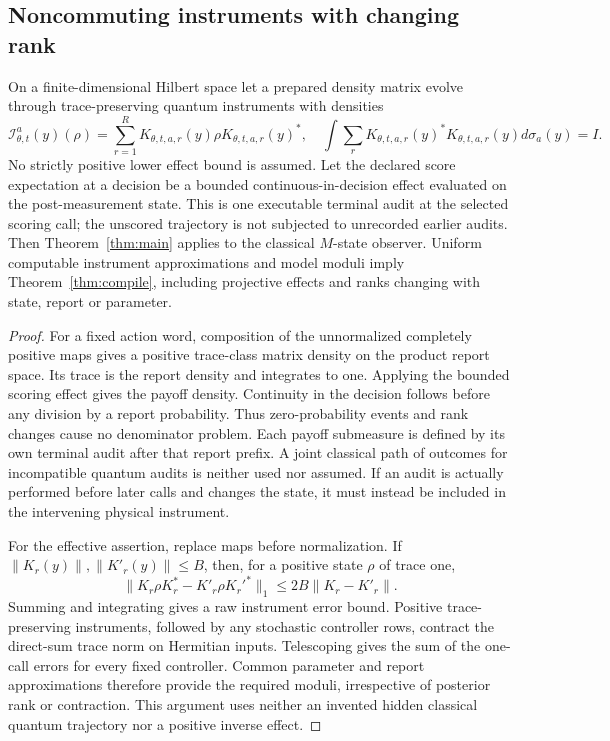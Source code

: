 \subsection{Noncommuting instruments with changing rank}
\begin{theorem}\label{thm:quantum}
On a finite-dimensional Hilbert space let a prepared density matrix evolve through trace-preserving quantum instruments with densities
\[
 \mathcal I_{\theta,t}^a(y)(\rho)
       =\sum_{r=1}^R K_{\theta,t,a,r}(y)\rho K_{\theta,t,a,r}(y)^*,
 \quad \int\sum_r K_{\theta,t,a,r}(y)^*K_{\theta,t,a,r}(y)d\sigma_a(y)=I.
\]
No strictly positive lower effect bound is assumed. Let the declared score expectation at a decision be a bounded continuous-in-decision effect evaluated on the post-measurement state. This is one executable terminal audit at the selected scoring call; the unscored trajectory is not subjected to unrecorded earlier audits. Then Theorem~\ref{thm:main} applies to the classical $M$-state observer. Uniform computable instrument approximations and model moduli imply Theorem~\ref{thm:compile}, including projective effects and ranks changing with state, report or parameter.
\end{theorem}
\begin{proof}
For a fixed action word, composition of the unnormalized completely positive maps gives a positive trace-class matrix density on the product report space. Its trace is the report density and integrates to one. Applying the bounded scoring effect gives the payoff density. Continuity in the decision follows before any division by a report probability. Thus zero-probability events and rank changes cause no denominator problem. Each payoff submeasure is defined by its own terminal audit after that report prefix. A joint classical path of outcomes for incompatible quantum audits is neither used nor assumed. If an audit is actually performed before later calls and changes the state, it must instead be included in the intervening physical instrument.

For the effective assertion, replace maps before normalization. If $\|K_r(y)\|,\|K'_r(y)\|\le B$, then, for a positive state $\rho$ of trace one,
\[
 \|K_r\rho K_r^*-K'_r\rho K_r'^*\|_1
 \le 2B\|K_r-K'_r\|.
\]
Summing and integrating gives a raw instrument error bound. Positive trace-preserving instruments, followed by any stochastic controller rows, contract the direct-sum trace norm on Hermitian inputs. Telescoping gives the sum of the one-call errors for every fixed controller. Common parameter and report approximations therefore provide the required moduli, irrespective of posterior rank or contraction. This argument uses neither an invented hidden classical quantum trajectory nor a positive inverse effect.
\end{proof}
